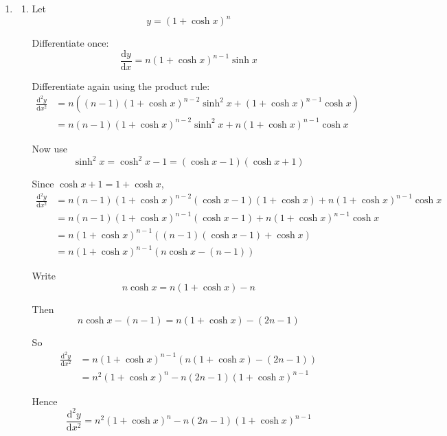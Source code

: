 \documentclass[leqno]{article}
\begin{document}
\begin{enumerate}[
  label=\textbf{\arabic*.},
  leftmargin=*,
  topsep=0pt,
  partopsep=0pt,
  parsep=0pt
]
\vspace*{30pt}

\begin{tcolorbox}[colback=white, colframe=scarlet, title={\textbf{Solution}}, breakable, grow to left by=6mm, grow to right by=10mm]
\begin{enumerate}[label=\textbf{(\alph*)}]
  \item
  \begin{enumerate}[label=\textbf{(\roman*)}]
    \item Let
    \[
    y=(1+\cosh x)^n
    \]

    Differentiate once:
    \[
    \frac{\mathrm{d}y}{\mathrm{d}x}=n(1+\cosh x)^{n-1}\sinh x
    \]

    Differentiate again using the product rule:
    \begin{align*}
    \frac{\mathrm{d}^2y}{\mathrm{d}x^2}
    &=n\left((n-1)(1+\cosh x)^{n-2}\sinh^2 x+(1+\cosh x)^{n-1}\cosh x\right) \\
    &=n(n-1)(1+\cosh x)^{n-2}\sinh^2 x+n(1+\cosh x)^{n-1}\cosh x
    \end{align*}

    Now use
    \[
    \sinh^2 x=\cosh^2 x-1=(\cosh x-1)(\cosh x+1)
    \]

    Since $\cosh x+1=1+\cosh x$,
    \begin{align*}
    \frac{\mathrm{d}^2y}{\mathrm{d}x^2}
    &=n(n-1)(1+\cosh x)^{n-2}(\cosh x-1)(1+\cosh x)+n(1+\cosh x)^{n-1}\cosh x \\
    &=n(n-1)(1+\cosh x)^{n-1}(\cosh x-1)+n(1+\cosh x)^{n-1}\cosh x \\
    &=n(1+\cosh x)^{n-1}\left((n-1)(\cosh x-1)+\cosh x\right) \\
    &=n(1+\cosh x)^{n-1}\left(n\cosh x-(n-1)\right)
    \end{align*}

    Write
    \[
    n\cosh x=n(1+\cosh x)-n
    \]

    Then
    \[
    n\cosh x-(n-1)=n(1+\cosh x)-(2n-1)
    \]

    So
    \begin{align*}
    \frac{\mathrm{d}^2y}{\mathrm{d}x^2}
    &=n(1+\cosh x)^{n-1}\left(n(1+\cosh x)-(2n-1)\right) \\
    &=n^2(1+\cosh x)^n-n(2n-1)(1+\cosh x)^{n-1}
    \end{align*}

    Hence
    \[
    \frac{\mathrm{d}^2 y}{\mathrm{d}x^2} = n^2(1+\cosh x)^n - n(2n-1)(1+\cosh x)^{n-1}
    \]


\end{enumerate}
\end{enumerate}
\end{tcolorbox}
\end{enumerate}
\end{document}
